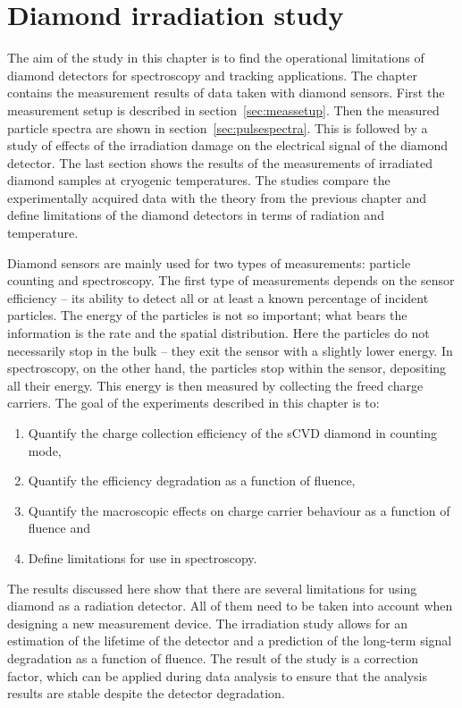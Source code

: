  
\chapter{Diamond irradiation study}%
\label{ch:meas}


The aim of the study in this chapter is to find the operational limitations of diamond detectors for spectroscopy and tracking applications. The chapter contains the measurement results of data taken with diamond sensors. First the measurement setup is described in section~\ref{sec:meassetup}. Then the measured particle spectra are shown in section~\ref{sec:pulsespectra}. This is followed by a study of effects of the irradiation damage on the electrical signal of the diamond detector. The last section shows the results of the measurements of irradiated diamond samples at cryogenic temperatures. The studies compare the experimentally acquired data with the theory from the previous chapter and define limitations of the diamond detectors in terms of radiation and temperature.

Diamond sensors are mainly used for two types of measurements: particle counting and spectroscopy. The first type of measurements depends on the sensor efficiency -- its ability to detect all or at least a known percentage of incident particles. The energy of the particles is not so important; what bears the information is the rate and the spatial distribution. Here the particles do not necessarily stop in the bulk -- they exit the sensor with a slightly lower energy. In spectroscopy, on the other hand, the particles stop within the sensor, depositing all their energy. This energy is then measured by collecting the freed charge carriers. The goal of the experiments described in this chapter is to:
\begin{enumerate}[itemsep=0.1\baselineskip]
\item Quantify the charge collection efficiency of the sCVD diamond in counting mode, 
\item Quantify the efficiency degradation as a function of fluence,
\item Quantify the macroscopic effects on charge carrier behaviour as a function of fluence and 
\item Define limitations for use in spectroscopy.
\end{enumerate}
The results discussed here show that there are several limitations for using diamond as a radiation detector. All of them need to be taken into account when designing a new measurement device. The irradiation study allows for an estimation of the lifetime of the detector and a prediction of the long-term signal degradation as a function of fluence. The result of the study is a correction factor, which can be applied during data analysis to ensure that the analysis results are stable despite the detector degradation.


